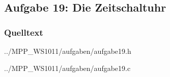 \subsection*{Aufgabe 19: Die Zeitschaltuhr}

\subsubsection*{Quelltext}

{../MPP_WS1011/aufgaben/aufgabe19.h}


{../MPP_WS1011/aufgaben/aufgabe19.c}

